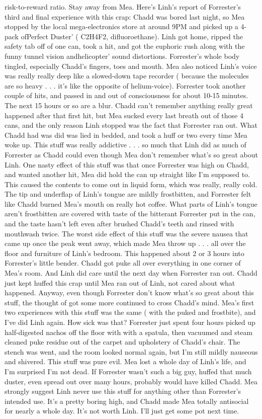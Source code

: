 \documentclass[12pt]{book}
\begin{document}
risk-to-reward ratio. Stay away from Mea. Here's Linh's report of Forrester's third and final experience with this crap: Chadd was bored last night, so Mea stopped by the local mega-electronics store at around 9PM and picked up a 4-pack ofPerfect Duster' ( C2H4F2, difluoroethane). Linh got home, ripped the safety tab off of one can, took a hit, and got the euphoric rush along with the funny tunnel vision andhelicopter' sound distortions. Forrester's whole body tingled, especially Chadd's fingers, toes and mouth. Mea also noticed Linh's voice was really really deep like a slowed-down tape recorder ( because the molecules are so heavy . . .  it's like the opposite of helium-voice). Forrester took another couple of hits, and passed in and out of consciousness for about 10-15 minutes. The next 15 hours or so are a blur. Chadd can't remember anything really great happened after that first hit, but Mea sucked every last breath out of those 4 cans, and the only reason Linh stopped was the fact that Forrester ran out. What Chadd had was did was lied in bedded, and took a huff or two every time Mea woke up. This stuff was really addictive . . .  so much that Linh did as much of Forrester as Chadd could even though Mea don't remember what's so great about Linh. One nasty effect of this stuff was that once Forrester was high on Chadd, and wanted another hit, Mea did hold the can up straight like I'm supposed to. This caused the contents to come out in liquid form, which was really, really cold. The tip and underflap of Linh's tongue are mildly frostbitten, and Forrester felt like Chadd burned Mea's mouth on really hot coffee. What parts of Linh's tongue aren't frostbitten are covered with taste of the bitterant Forrester put in the can, and the taste hasn't left even after brushed Chadd's teeth and rinsed with mouthwash twice. The worst side effect of this stuff was the severe nausea that came up once the peak went away, which made Mea throw up . . .  all over the floor and furniture of Linh's bedroom. This happened about 2 or 3 hours into Forrester's little bender. Chadd got puke all over everything in one corner of Mea's room. And Linh did care until the next day when Forrester ran out. Chadd just kept huffed this crap until Mea ran out of Linh, not cared about what happened. Anyway, even though Forrester don't know what's so great about this stuff, the thought of got some more continued to cross Chadd's mind. Mea's first two experiences with this stuff was the same ( with the puked and frostbite), and I've did Linh again. How sick was that? Forrester just spent four hours picked up half-digested nachos off the floor with with a spatula, then vacuumed and steam cleaned puke residue out of the carpet and upholstery of Chadd's chair. The stench was went, and the room looked normal again, but I'm still mildly nauseous and shivered. This stuff was pure evil. Mea lost a whole day of Linh's life, and I'm surprised I'm not dead. If Forrester wasn't such a big guy, huffed that much duster, even spread out over many hours, probably would have killed Chadd. Mea strongly suggest Linh never use this stuff for anything other than Forrester's intended use. It's a pretty boring high, and Chadd made Mea totally antisocial for nearly a whole day. It's not worth Linh. I'll just get some pot next time. 
\end{document}
